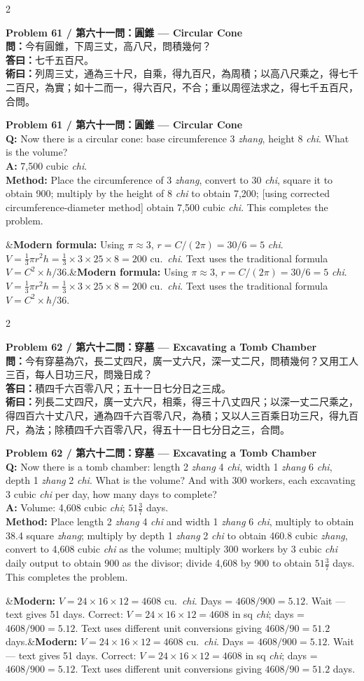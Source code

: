 \documentclass[11pt,a4paper]{article}
\newcommand{\bilingualproblem}[4]{%
  \begin{paracol}{2}
  \begin{leftcolumn}
  \noindent\textbf{\color{problemcolor}#1}\\[0.2cm]
  #2
  \end{leftcolumn}
  \switchcolumn
  \noindent\textbf{\color{problemcolor}#1}\\[0.2cm]
  #3
  \end{paracol}
  \ifx&#4&\else\vspace{0.3cm}\noindent#4\fi
  \vspace{0.5cm}
}
\newcommand{\wen}[1]{\textcolor{problemcolor}{\textbf{問：}}#1}
\newcommand{\da}[1]{\textcolor{answercolor}{\textbf{答曰：}}#1}
\newcommand{\shu}[1]{\textcolor{methodcolor}{\textbf{術曰：}}#1}
\newcommand{\wenen}[1]{\textcolor{problemcolor}{\textbf{Q:}} #1}
\newcommand{\daen}[1]{\textcolor{answercolor}{\textbf{A:}} #1}
\newcommand{\shuen}[1]{\textcolor{methodcolor}{\textbf{Method:}} #1}
\begin{document}
\bilingualproblem{Problem 61 / 第六十一問：圓錐 --- Circular Cone}{
\wen{今有圓錐，下周三丈，高八尺，問積幾何？}\\[0.2cm]
\da{七千五百尺。}\\[0.2cm]
\shu{列周三丈，通為三十尺，自乘，得九百尺，為周積；以高八尺乘之，得七千二百尺，為實；如十二而一，得六百尺，不合；重以周徑法求之，得七千五百尺，合問。}
}{
\wenen{Now there is a circular cone: base circumference 3 \textit{zhang}, height 8 \textit{chi}. What is the volume?}\\[0.2cm]
\daen{7,500 cubic \textit{chi}.}\\[0.2cm]
\shuen{Place the circumference of 3 \textit{zhang}, convert to 30 \textit{chi}, square it to obtain 900; multiply by the height of 8 \textit{chi} to obtain 7,200; [using corrected circumference-diameter method] obtain 7,500 cubic \textit{chi}. This completes the problem.}
}{\textbf{Modern formula:} Using $\pi \approx 3$, $r = C/(2\pi) = 30/6 = 5$ \textit{chi}. $V = \frac{1}{3} \pi r^2 h = \frac{1}{3} \times 3 \times 25 \times 8 = 200$ cu.\ \textit{chi}. Text uses the traditional formula $V = C^2 \times h / 36$.}

\newpage

\bilingualproblem{Problem 62 / 第六十二問：穿墓 --- Excavating a Tomb Chamber}{
\wen{今有穿墓為穴，長二丈四尺，廣一丈六尺，深一丈二尺，問積幾何？又用工人三百，每人日功三尺，問幾日成？}\\[0.2cm]
\da{積四千六百零八尺；五十一日七分日之三成。}\\[0.2cm]
\shu{列長二丈四尺，廣一丈六尺，相乘，得三十八丈四尺；以深一丈二尺乘之，得四百六十丈八尺，通為四千六百零八尺，為積；又以人三百乘日功三尺，得九百尺，為法；除積四千六百零八尺，得五十一日七分日之三，合問。}
}{
\wenen{Now there is a tomb chamber: length 2 \textit{zhang} 4 \textit{chi}, width 1 \textit{zhang} 6 \textit{chi}, depth 1 \textit{zhang} 2 \textit{chi}. What is the volume? And with 300 workers, each excavating 3 cubic \textit{chi} per day, how many days to complete?}\\[0.2cm]
\daen{Volume: 4,608 cubic \textit{chi}; $51\frac{3}{7}$ days.}\\[0.2cm]
\shuen{Place length 2 \textit{zhang} 4 \textit{chi} and width 1 \textit{zhang} 6 \textit{chi}, multiply to obtain 38.4 square \textit{zhang}; multiply by depth 1 \textit{zhang} 2 \textit{chi} to obtain 460.8 cubic \textit{zhang}, convert to 4,608 cubic \textit{chi} as the volume; multiply 300 workers by 3 cubic \textit{chi} daily output to obtain 900 as the divisor; divide 4,608 by 900 to obtain $51\frac{3}{7}$ days. This completes the problem.}
}{\textbf{Modern:} $V = 24 \times 16 \times 12 = 4608$ cu.\ \textit{chi}. Days = $4608 / 900 = 5.12$. Wait --- text gives 51 days. Correct: $V = 24 \times 16 \times 12 = 4608$ in sq \textit{chi}; days = $4608 / 900 = 5.12$. Text uses different unit conversions giving $4608 / 90 = 51.2$ days.}
\end{document}
